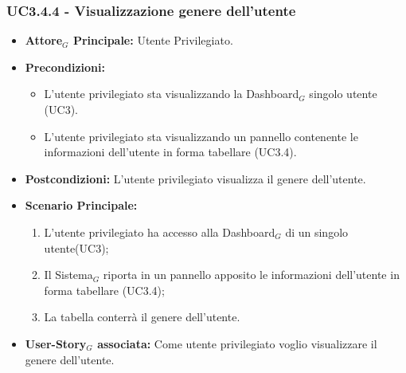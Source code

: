\documentclass[10pt]{article}
\begin{document}
\begin{justify}
\subsubsection{\textbf{UC3.4.4 - Visualizzazione genere dell'utente}}
\label{UC3.4.4}
\begin{itemize}
     \item \textbf{Attore$_G$ Principale:} Utente Privilegiato.
     \item \textbf{Precondizioni:}
        \begin{itemize}
    	\item L'utente privilegiato sta visualizzando la Dashboard$_G$ singolo utente (UC3).
          \item L'utente privilegiato sta visualizzando un pannello contenente le informazioni dell'utente in forma tabellare (UC3.4).
        \end{itemize}
      \item \textbf{Postcondizioni:} L'utente privilegiato visualizza il genere dell'utente.
      \item \textbf{Scenario Principale:}
        \begin{enumerate}
            \item L'utente privilegiato ha accesso alla Dashboard$_G$ di un singolo utente(UC3);
            \item Il Sistema$_G$ riporta  in un pannello apposito le informazioni dell'utente in forma tabellare (UC3.4);
            \item La tabella conterrà il genere dell'utente.
        \end{enumerate}
     \item \textbf{User-Story$_G$ associata:}
       Come utente privilegiato voglio visualizzare il genere dell'utente.
\end{itemize}


\end{justify}
\end{document}
